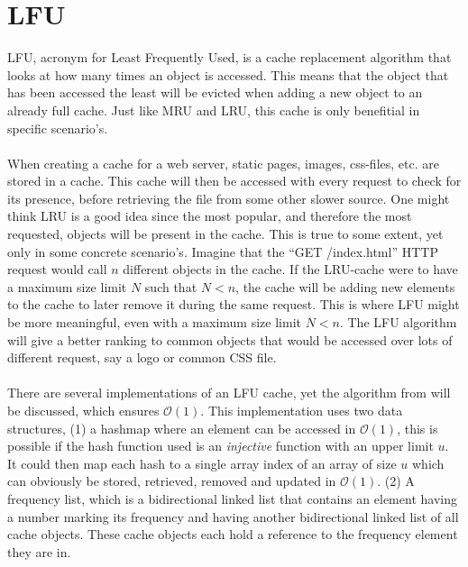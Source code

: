 \documentclass[pdftex,a4paper,12pt,twoside]{report}
\begin{document}
\section{LFU}
\label{sec:LFU}
LFU, acronym for Least Frequently Used, is a cache replacement algorithm that looks at how many times an object is accessed. This means that the object that has been accessed the least will be evicted when adding a new object to an already full cache. Just like MRU and LRU, this cache is only benefitial in specific scenario's.
\\\\
When creating a cache for a web server, static pages, images, css-files, etc. are stored in a cache. This cache will then be accessed with every request to check for its presence, before retrieving the file from some other slower source. One might think LRU is a good idea since the most popular, and therefore the most requested, objects will be present in the cache. This is true to some extent, yet only in some concrete scenario's. Imagine that the ``GET /index.html'' HTTP request would call $n$ different objects in the cache. If the LRU-cache were to have a maximum size limit $N$ such that $N < n$, the cache will be adding new elements to the cache to later remove it during the same request. This is where LFU might be more meaningful, even with a maximum size limit $N < n$. The LFU algorithm will give a better ranking to common objects that would be accessed over lots of different request, say a logo or common CSS file.
\\\\
There are several implementations of an LFU cache, yet the algorithm from \cite{shah20101} will be discussed, which ensures $\mathcal{O}(1)$.
This implementation uses two data structures, (1) a hashmap where an element can be accessed in $\mathcal{O}(1)$, this is possible if the hash function used is an 
\emph{injective} function with an upper limit $u$. It could then map each hash to a single array index of an array of size $u$ which can obviously be stored, retrieved, removed and updated in $\mathcal{O}(1)$. (2) A frequency list, which is a bidirectional linked list that contains an element having a number marking its frequency and having another bidirectional linked list of all cache objects. These cache objects each hold a reference to the frequency element they are in.
\end{document}
